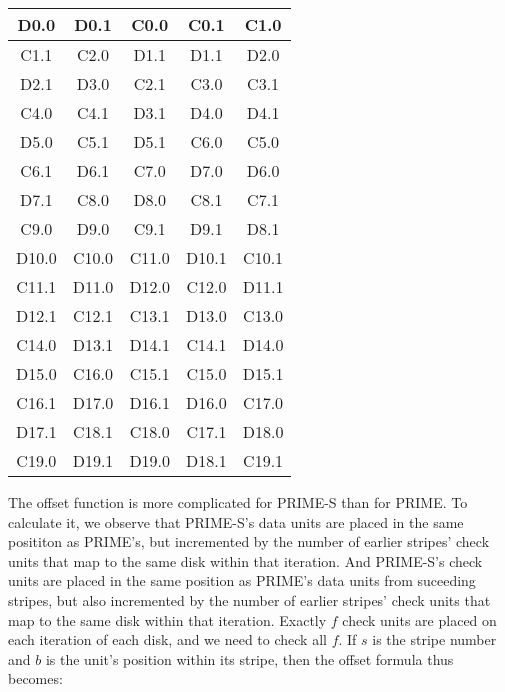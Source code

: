 \documentclass[onecolumn,draft]{IEEEtran}
\begin{document}
\begin{center}
\begin{tabular}{ |c|c|c|c|c| }
  \hline
  D0.0 & D0.1 & \cellcolor{lightgray}C0.0 & \cellcolor{lightgray}C0.1 & \cellcolor{lightgray}C1.0 \\
  \hline
  \cellcolor{lightgray}C1.1 & \cellcolor{lightgray}C2.0 & D1.1 & D1.1 & D2.0 \\
  \hline
  D2.1 & D3.0 & \cellcolor{lightgray}C2.1 & \cellcolor{lightgray}C3.0 & \cellcolor{lightgray}C3.1 \\
  \hline
  \cellcolor{lightgray}C4.0 & \cellcolor{lightgray}C4.1 & D3.1 & D4.0 & D4.1 \\
  \hline
  D5.0 & \cellcolor{lightgray}C5.1 & D5.1 & \cellcolor{lightgray}C6.0 & \cellcolor{lightgray}C5.0 \\
  \hline
  \cellcolor{lightgray}C6.1 & D6.1 & \cellcolor{lightgray}C7.0 & D7.0 & D6.0 \\
  \hline
  D7.1 & \cellcolor{lightgray}C8.0 & D8.0 & \cellcolor{lightgray}C8.1 & \cellcolor{lightgray}C7.1 \\
  \hline
  \cellcolor{lightgray}C9.0 & D9.0 & \cellcolor{lightgray}C9.1 & D9.1 & D8.1 \\
  \hline
  D10.0 & \cellcolor{lightgray}C10.0 & \cellcolor{lightgray}C11.0 & D10.1 & \cellcolor{lightgray}C10.1 \\
  \hline
  \cellcolor{lightgray}C11.1 & D11.0 & D12.0 & \cellcolor{lightgray}C12.0 & D11.1 \\
  \hline
  D12.1 & \cellcolor{lightgray}C12.1 & \cellcolor{lightgray}C13.1 & D13.0 & \cellcolor{lightgray}C13.0 \\
  \hline
  \cellcolor{lightgray}C14.0 & D13.1 & D14.1 & \cellcolor{lightgray}C14.1 & D14.0 \\
  \hline
  D15.0 & \cellcolor{lightgray}C16.0 & \cellcolor{lightgray}C15.1 & \cellcolor{lightgray}C15.0 & D15.1 \\
  \hline
  \cellcolor{lightgray}C16.1 & D17.0 & D16.1 & D16.0 & \cellcolor{lightgray}C17.0 \\
  \hline
  D17.1 & \cellcolor{lightgray}C18.1 & \cellcolor{lightgray}C18.0 & \cellcolor{lightgray}C17.1 & D18.0 \\
  \hline
  \cellcolor{lightgray}C19.0 & D19.1 & D19.0 & D18.1 & \cellcolor{lightgray}C19.1 \\
  \hline
\end{tabular}
\end{center}

The offset function is more complicated for PRIME-S than for PRIME.  To
calculate it, we observe that PRIME-S's data units are placed in the same
posititon as PRIME's, but incremented by the number of earlier stripes' check
units that map to the same disk within that iteration.  And PRIME-S's check
units are placed in the same position as PRIME's data units from suceeding
stripes, but also incremented by the number of earlier stripes' check units
that map to the same disk within that iteration.  Exactly $f$ check units are
placed on each iteration of each disk, and we need to check all $f$.  If $s$ is
the stripe number and $b$ is the unit's position within its stripe, then the
offset formula thus becomes:
\end{document}
